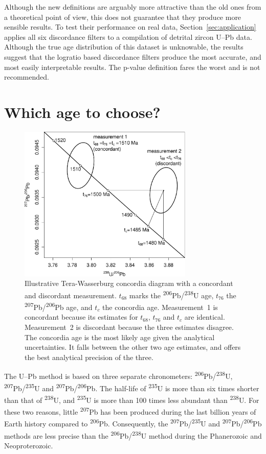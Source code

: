 \documentclass[gchron, manuscript]{copernicus}
\begin{document}
Although the new definitions are arguably more attractive than the old
ones from a theoretical point of view, this does not guarantee that
they produce more sensible results. To test their performance on real
data, Section~\ref{sec:application} applies all six discordance
filters to a compilation of detrital zircon U--Pb data. Although the
true age distribution of this dataset is unknowable, the results
suggest that the logratio based discordance filters produce the most
accurate, and most easily interpretable results. The p-value
definition fares the worst and is not recommended.

\section{Which age to choose?}\label{sec:whichage}

\begin{figure}[t]
  \includegraphics[width=8.3cm]{TW1500.pdf}
  \caption{Illustrative Tera-Wasserburg concordia diagram with a
    concordant and discordant measurement. $t_{68}$ marks the
    \textsuperscript{206}Pb/\textsuperscript{238}U age, $t_{76}$ the
    \textsuperscript{207}Pb/\textsuperscript{206}Pb age, and $t_{c}$
    the concordia age. Measurement~1 is concordant because its
    estimates for $t_{68}$, $t_{76}$ and $t_{c}$ are
    identical. Measurement~2 is discordant because the three estimates
    disagree. The concordia age is the most likely age given the
    analytical uncertainties. It falls between the other two age
    estimates, and offers the best analytical precision of the
    three.}
  \label{fig:concordia}
\end{figure}

The U--Pb method is based on three separate chronometers:
\textsuperscript{206}Pb/\textsuperscript{238}U,
\textsuperscript{207}Pb/\textsuperscript{235}U and
\textsuperscript{207}Pb/\textsuperscript{206}Pb. The half-life of
\textsuperscript{235}U is more than six times shorter than that of
\textsuperscript{238}U, and \textsuperscript{235}U is more than 100
times less abundant than \textsuperscript{238}U. For these two
reasons, little \textsuperscript{207}Pb has been produced during the
last billion years of Earth history compared to
\textsuperscript{206}Pb. Consequently, the
\textsuperscript{207}Pb/\textsuperscript{235}U and
\textsuperscript{207}Pb/\textsuperscript{206}Pb methods are less
precise than the \textsuperscript{206}Pb/\textsuperscript{238}U method
during the Phanerozoic and Neoproterozoic.
\end{document}
